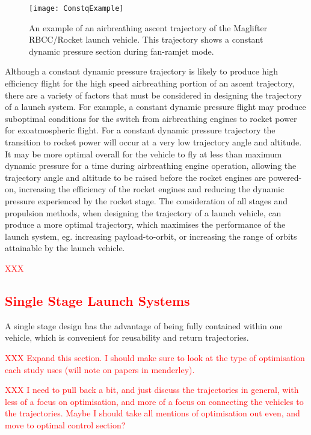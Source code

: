   \begin{figure}[ht]
  	\centering
  	\texttt{[image: ConstqExample]}
  	\caption{An example of an airbreathing ascent trajectory of the Maglifter RBCC/Rocket launch vehicle\cite{Olds1998}. This trajectory shows a constant dynamic pressure section during fan-ramjet mode\cite{Olds1998}.}
  	\label{fig:constqexample}
  \end{figure}
  Although a constant dynamic pressure trajectory is likely to produce high efficiency flight for the high speed airbreathing portion of an ascent trajectory, there are a variety of factors that must be considered in designing the trajectory of a launch system. 
  For example, a constant dynamic pressure flight may produce suboptimal conditions for the switch from airbreathing engines to rocket power for exoatmospheric flight. 
  For a constant dynamic pressure trajectory the transition to rocket power will occur at a very low trajectory angle and altitude\cite{Preller2017b}. 
  It may be more optimal overall for the vehicle to fly at less than maximum dynamic pressure for a time during airbreathing engine operation, allowing the trajectory angle and altitude to be raised before the rocket engines are powered-on, increasing the efficiency of the rocket engines and reducing the dynamic pressure experienced by the rocket stage\cite{Tsuchiya2005,Wilhite1991,Mehta2001}.
  The consideration of all stages and propulsion methods, when designing the trajectory of a launch vehicle, can produce a more optimal trajectory, which maximises the performance of the launch system, eg. increasing payload-to-orbit, or increasing the range of orbits attainable by the launch vehicle.
  
  
  
  
 \textcolor{red}{XXX 
  \subsection{Single Stage Launch Systems}
}

A single stage design has the advantage of being fully contained within one vehicle, which is convenient for reusability and return trajectories. 

  	\textcolor{red}{XXX Expand this section. I should make sure to look at the type of optimisation each study uses (will note on papers in menderley).}
  	
  	\textcolor{red}{XXX I need to pull back a bit, and just discuss the trajectories in general, with less of a focus on optimisation, and more of a focus on connecting the vehicles to the trajectories. Maybe I should take all mentions of optimisation out even, and move to optimal control section?}
  	
